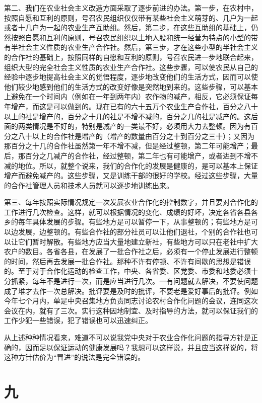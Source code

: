第二、我们在农业社会主义改造方面采取了逐步前进的办法。第一步，在农村中，按照自愿和互利的原则，号召农民组织仅仅带有某些社会主义萌芽的、几户为一起或者十几户为一起的农业生产互助组。然后，第二步，在这些互助组的基础上，仍然按照自愿和互利的原则，号召农民组织以土地入股和统一经营为特点的小型的带有半社会主义性质的农业生产合作社。然后，第三步，才在这些小型的半社会主义的合作社的基础上，按照同样的自愿和互利的原则，号召农民进一步地联合起来，组织大型的完全社会主义性质的农业生产合作社。这些步骤，可以使农民从自己的经验中逐步地提高社会主义的觉悟程度，逐步地改变他们的生活方式，因而可以使他们较少地感到他们的生活方式的改变好像是突然地到来的。这些步骤，可以基本上避免在一个时间内（例如在一年到两年内）农作物的减产，相反，它必须保证每年增产，而这是可以做到的。现在已有的六十五万个农业生产合作社，百分之八十以上的社是增产的，百分之十几的社是不增不减的，百分之几的社是减产的。这后面的两类情况是不好的，特别是减产的一类最不好，必须用大力去整顿。因为有百分之八十以上的合作社是增产的（增产的数量由百分之十到百分之三十）；又因为那百分之十几的合作社虽然第一年不增不减，但是经过整顿，第二年可能增产；最后，那百分之几减产的合作社，经过整顿，第二年也有可能增产，或者进到不增不减的地位。所以，就整个说来，我们的合作化的发展是健康的，是可以基本上保证增产而避免减产的。这些步骤，又是训练干部的很好的学校。经过这些步骤，大量的合作社管理人员和技术人员就可以逐步地训练出来。

第三、每年按照实际情况规定一次发展农业合作化的控制数字，并且要对合作化的工作进行几次检查。这样，就可以根据情况的变化、成绩的好坏，决定各省各县各乡的每年具体发展的步骤。有些地方是可以暂停一下，从事整顿的；有些地方是可以边发展，边整顿的。有些合作社的部分社员可以让他们退社，个别的合作社也可以让它们暂时解散。有些地方应当大量地建立新社，有些地方可以只在老社中扩大农户的数目。各省各县，在发展了一批合作社之后，必须有一个停止发展进行整顿的时间，然后再去发展一批合作社。那种不许有停顿、不许有间歇的思想是错误的。至于对于合作化运动的检查工作，中央、各省委、区党委、市委和地委必须十分抓紧，每年不是进行一次，而是应当进行几次。一有问题就去解决，不要使问题成了堆才去作一次总解决。批评要是及时的批评，不要老是爱好事后的批评。例如今年七个月内，单是中央召集地方负责同志讨论农村合作化问题的会议，连同这次会议在内，就有了三次。实行这种因地制宜、及时指导的方法，就可以保证我们的工作少犯一些错误，犯了错误也可以迅速纠正。

从上述种种情况看来，难道不可以说我党中央对于农业合作化问题的指导方针是正确的，因而足以保证运动的健康发展吗？我想可以这样说，并且应当这样说的，将这种方针估价为“冒进”的说法是完全错误的。

\section*{九}

